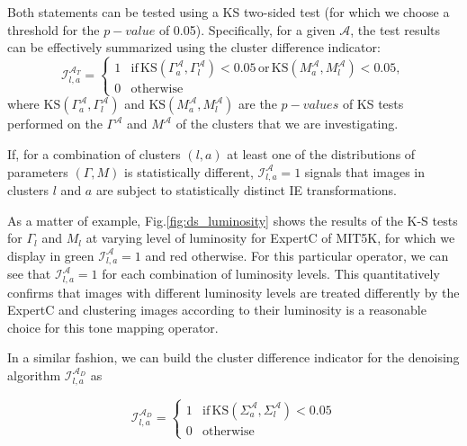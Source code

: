 \documentclass[12pt]{spieman}  %
\begin{document}
\begin{spacing}{2}
\begin{linenumbers}
Both statements can be tested using a KS two-sided test (for which we choose a threshold for the $p-value$ of 0.05). Specifically, for a given $\mathcal{A}$, the test results can be effectively summarized using the cluster difference indicator:
\begin{equation}
\mathcal{I}^{\mathcal{A}_T}_{l,a} = \left\{\begin{matrix}
	1 & \mathrm{if} \, \mathrm{KS}\left ( \Gamma^{\mathcal{A}}_a , \Gamma^{\mathcal{A}}_l  \right ) < 0.05 \, \mathrm{or} \, \mathrm{KS}\left ( M^{\mathcal{A}}_a , M^{\mathcal{A}}_l  \right ) < 0.05, \\ 
	0 &  \mathrm{otherwise}
\end{matrix}\right.
\label{eq:cluster_indicator}
\end{equation} 
where $\mathrm{KS}\left ( \Gamma^{\mathcal{A}}_a , \Gamma^{\mathcal{A}}_l  \right )$  and $\mathrm{KS}\left ( M^{\mathcal{A}}_a , M^{\mathcal{A}}_l  \right )$ are the $p-values$ of KS tests performed on the $\Gamma^{\mathcal{A}}$ and $M^{\mathcal{A}}$ of the clusters that we are investigating.

If, for a  combination of clusters $(l,a)$ at least one of the distributions of parameters $(\Gamma, M)$ is statistically different, $\mathcal{I}^{\mathcal{A}}_{l,a} = 1 $ signals that images in clusters $l$ and  $a$ are subject to statistically distinct IE transformations.

As a matter of example, Fig.\ref{fig:ds_luminosity} shows the results of the K-S tests for $\Gamma_l$ and $M_l$ at varying level of luminosity for ExpertC of MIT5K, for which we display in green $\mathcal{I}^{\mathcal{A}}_{l,a} = 1$ and red otherwise.  For this particular operator, we can see that $\mathcal{I}^{\mathcal{A}}_{l,a} = 1$ for each combination of luminosity levels. This quantitatively confirms that images with different luminosity levels are treated differently by the ExpertC and clustering images according to their luminosity is a reasonable choice for this tone mapping operator. 


In a similar fashion, we can build the cluster difference indicator for the denoising algorithm $\mathcal{I}^{\mathcal{A}_{D}}_{l,a} $ as 

\begin{equation}
	\mathcal{I}^{\mathcal{A}_{D}}_{l,a} = \left\{\begin{matrix}
		1 & \mathrm{if} \, \mathrm{KS}\left ( \Sigma^{\mathcal{A}}_a , \Sigma^{\mathcal{A}}_l  \right ) < 0.05  \\ 
		0 &  \mathrm{otherwise}
	\end{matrix}\right.
	\label{eq:cluster_indicator_var}
\end{equation} 


\end{linenumbers}
\end{spacing}
\end{document}
